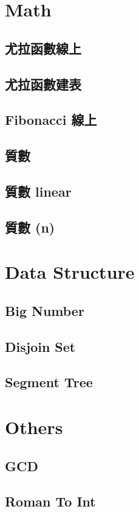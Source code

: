 \section{Math}
\subsection{尤拉函數線上}

\subsection{尤拉函數建表}

\subsection{Fibonacci 線上}

\subsection{質數}

\subsection{質數 linear}

\subsection{質數 (n)}


\section{Data Structure}
\subsection{Big Number}

\subsection{Disjoin Set}

\subsection{Segment Tree}


\section{Others}
\subsection{GCD}

\subsection{Roman To Int}
